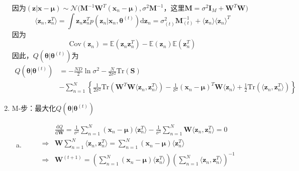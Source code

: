 \begin{enumerate}
\begin{equation}
	\end{equation}
	因为$		(\boldsymbol{z}|\boldsymbol{x}-\boldsymbol{\mu})\sim \mathcal{N}(\boldsymbol{M}^{-1}\boldsymbol{W}^T(\boldsymbol{x}_n-\boldsymbol{\mu}),\sigma^2\boldsymbol{M}^{-1}$，这里$\boldsymbol{M}=\sigma^2\boldsymbol{I}_M+\boldsymbol{W}^T\boldsymbol{W})$
	\begin{equation}
		\langle \boldsymbol{z}_n,\boldsymbol{z}_n^T\rangle=\int \boldsymbol{z}_n\boldsymbol{z}_n^Tp(\boldsymbol{z}_n|\boldsymbol{x}_n,\boldsymbol{\theta}^{(t)})\mathrm{d}\boldsymbol{z}_n=\sigma_{(t)}^2\boldsymbol{M}_{(t)}^{-1}+\langle\boldsymbol{z}_n\rangle\langle\boldsymbol{z}_n\rangle^T
	\end{equation}
	因为
	\begin{equation}
		\mathrm{Cov}(\boldsymbol{z}_n)=\mathbb{E}(\boldsymbol{z}_n\boldsymbol{z}_n^T)-\mathbb{E}(\boldsymbol{z}_n)\mathbb{E}(\boldsymbol{z}_n^T)
	\end{equation}
	因此，$Q(\boldsymbol{\theta}|\boldsymbol{\theta}^{(t)})$为
	\begin{equation}
	\begin{aligned}
		Q(\boldsymbol{\theta}|\boldsymbol{\theta}^{(t)})&=-\frac{ND}{2}\ln \sigma^2-\frac{N}{2\sigma^2}\mathrm{Tr}(\boldsymbol{S})\\
		&-\sum_{n=1}^{N}\left\{\frac{1}{2\sigma^2}\mathrm{Tr}(\boldsymbol{W}^T\boldsymbol{W}\langle \boldsymbol{z}_n,\boldsymbol{z}_n^T\rangle)-\frac{1}{\sigma^2}(\boldsymbol{x}_n-\boldsymbol{\mu})^T\boldsymbol{W}\langle\boldsymbol{z}_n\rangle+\frac{1}{2}\mathrm{Tr}(\langle \boldsymbol{z}_n,\boldsymbol{z}_n^T\rangle) \right\}
	\end{aligned}
	\end{equation}
	\item M-步：最大化$Q(\boldsymbol{\theta}|\boldsymbol{\theta}^{(t)})$
	\begin{enumerate}[(a)]
		\item 
		\begin{equation}
			\begin{aligned}
				&\frac{\mathrm{d}Q}{\mathrm{d}\boldsymbol{W}}=\frac{1}{\sigma^2}\sum_{n=1}^{N}(\boldsymbol{x}_n-\boldsymbol{\mu})\langle \boldsymbol{z}_n^T\rangle -\frac{1}{\sigma^2}\sum_{n=1}^{N}\boldsymbol{W}\langle \boldsymbol{z}_n,\boldsymbol{z}_n^T\rangle =0\\
				\Rightarrow&\boldsymbol{W}\sum_{n=1}^{N}\langle \boldsymbol{z}_n,\boldsymbol{z}_n^T\rangle =\sum_{n=1}^{N}(\boldsymbol{x}_n-\boldsymbol{\mu})\langle \boldsymbol{z}_n^T\rangle\\
				\Rightarrow&\boldsymbol{W}^{(t+1)}=\left(\sum_{n=1}^{N}(\boldsymbol{x}_n-\boldsymbol{\mu})\langle \boldsymbol{z}_n^T\rangle \right)\left(\sum_{n=1}^{N}\langle \boldsymbol{z}_n,\boldsymbol{z}_n^T\rangle \right)^{-1}

\end{aligned}
\end{equation}
\end{enumerate}
\end{enumerate}
